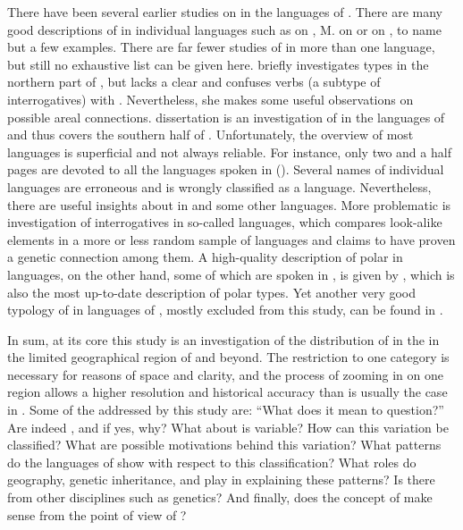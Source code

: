 There have been several earlier studies on  in the languages of . There are many good descriptions of  in individual languages such as \citet{ZhangDingjing1991} on , M. \cite{HayashiM2010} on  or \cite{Yoon2010} on , to name but a few examples. There are far fewer studies of  in more than one language, but still no exhaustive list can be given here. \citet{Audova1997} briefly investigates  types in the northern part of , but lacks a clear  and confuses  verbs (a subtype of interrogatives) with . Nevertheless, she makes some useful observations on possible areal connections.  dissertation is an investigation of  in the languages of  and thus covers the southern half of . Unfortunately, the overview of most languages is superficial and not always reliable. For instance, only two and a half pages are devoted to all the  languages spoken in  (\citealt[133–135]{LuoTianhua2013}). Several names of individual languages are erroneous and  is wrongly classified as a  language. Nevertheless, there are useful insights about  in  and some other languages. More problematic is  investigation of interrogatives in so-called \textit{} languages, which compares look-alike elements in a more or less random sample of languages and claims to have proven a genetic connection among them. A high-quality description of polar  in  languages, on the other hand, some of which are spoken in , is given by \citet{Miestamo2011}, which is also the most up-to-date description of polar  types. Yet another very good typology of  in  languages of , mostly excluded from this study, can be found in \citet{Huang1999}.

In sum, at its core this study is an investigation of the distribution of  in the  in the limited geographical region of  and beyond. The restriction to one category is necessary for reasons of space and clarity, and the process of zooming in on one region allows a higher resolution and historical accuracy than is usually the case in . Some of the  addressed by this study are: “What does it mean to question?” \citep[561]{Sanitt2011} Are  indeed , and if yes, why? What about  is variable? How can this variation be classified? What are possible motivations behind this variation? What patterns do the languages of  show with respect to this classification? What roles do geography, genetic inheritance, and  play in explaining these patterns? Is there  from other disciplines such as genetics? And finally, does the concept of  make sense from the point of view of ?

